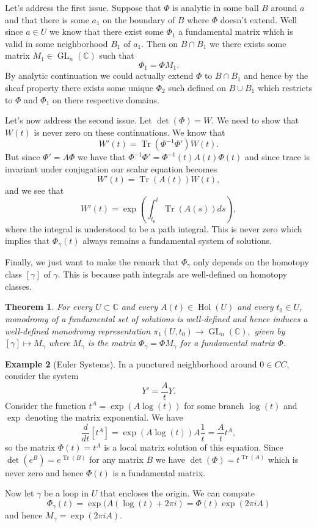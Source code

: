 \documentclass[12pt]{book}
\numberwithin{equation}{section}
\newtheorem{theorem}{Theorem}[subsection]
\theoremstyle{definition}
\newtheorem{example}[theorem]{Example}
\theoremstyle{remark}
\newcommand{\CC}{\mathbb{C}}
\newcommand{\hol}{\operatorname{Hol}}
\newcommand{\GL}{\operatorname{GL}}
\newcommand{\Tr}{\operatorname{Tr}}
\begin{document}
Let's address the first issue. 
Suppose that $\Phi$ is analytic in some ball $B$ around $a$ and that there is some $a_1$ on the boundary of $B$ where $\Phi$ doesn't extend. 
Well since $a \in U$ we know that there exist some $\Phi_1$ a fundamental matrix which is valid in some neighborhood $B_1$ of $a_1$. 
Then on $B\cap B_1$ we there exists some matrix $M_1 \in \GL_n(\CC)$ such that 
 $$ \Phi_1 = \Phi M_1.$$
By analytic continuation we could actually extend $\Phi$ to $B\cap B_1$ and hence by the sheaf property there exists some unique $\Phi_2$ such defined on $B \cup B_1$ which restricts to $\Phi$ and $\Phi_1$ on there respective domains.

Let's now address the second issue. 
Let $\det(\Phi)=W$. 
We need to show that $W(t)$ is never zero on these continuations. 
We know that 
 $$ W'(t) = \Tr( \Phi^{-1} \Phi') W(t). $$
But since $\Phi' = A\Phi$ we have that $\Phi^{-1} \Phi' = \Phi^{-1}(t) A(t) \Phi(t)$ and since trace is invariant under conjugation our scalar equation becomes 
 $$ W'(t) = \Tr(A(t)) W(t), $$
and we see that 
 $$ W'(t) = \exp(\int_{t_0}^t \Tr(A(s)) ds),$$
where the integral is understood to be a path integral. 
This is never zero which implies that $\Phi_{\gamma}(t)$ always remains a fundamental system of solutions.

Finally, we just want to make the remark that $\Phi_{\gamma}$ only depends on the homotopy class $[\gamma]$ of $\gamma$. 
This is because path integrals are well-defined on homotopy classes.  



\begin{theorem}
For every $U \subset \CC$ and every $A(t) \in \hol(U)$ and every $t_0 \in U$, monodromy of a fundamental set of solutions is well-defined and hence induces a well-defined monodromy representation $ \pi_1(U,t_0) \to \GL_n(\CC),$ given by $[\gamma] \mapsto M_{\gamma}$ where $M_{\gamma}$ is the matrix  $\Phi_{\gamma}=\Phi M_{\gamma}$ for a fundamental matrix $\Phi$.
\end{theorem}

	\begin{example}[Euler Systems]
	In a punctured neighborhood around $0 \in CC$, consider the system 
	$$ Y' = \frac{A}{t} Y. $$
	Consider the function $t^A = \exp(A \log(t))$ for some branch $\log(t)$ and $\exp$ denoting the matrix exponential. We have 
	$$\dfrac{d}{dt}\left[ t^A\right] = \exp(A \log(t) ) A \frac{1}{t} = \frac{A}{t} t^A,$$
	so the matrix $\Phi(t) = t^A$ is a local matrix solution of this equation. 
	Since $\det(e^B) = e^{\Tr(B)}$ for any matrix $B$ we have $\det(\Phi) = t^{\Tr(A)}$ which is never zero and hence $\Phi(t)$ is a fundamental matrix. 
	
	Now let $\gamma$ be a loop in $U$ that encloses the origin.  
	We can compute 
	 $$\Phi_{\gamma}(t) = \exp( A( \log(t) + 2\pi i) = \Phi(t) \exp(2\pi i A) $$
	and hence $M_{\gamma} = \exp(2\pi i A).$
\end{example}
\end{document}
